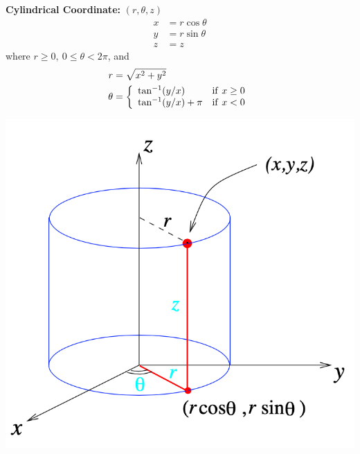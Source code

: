 \begin{spacing}{1.3}
    {\bf Cylindrical Coordinate:} $(r,\theta,z)$
    \begin{align*}
        x &= r\cos\theta\\ y&=r\sin\theta\\z&=z
    \end{align*}
    where $r\ge 0,\ 0\le \theta<2\pi$, and 
    \begin{align*}
        r &= \sqrt{x^2+y^2}\\
        \theta &= \left\{ \begin{array}{ll}
            \tan^{-1}(y/x) & {\rm if}\ x\ge 0\\
            \tan^{-1}(y/x)+\pi & {\rm if}\ x<0
        \end{array}\right.
    \end{align*}

    \begin{center}
        \includegraphics[scale=0.4]{images/Ch10-cylindrical-coor.png}
        \hspace{1in}

\end{center}
\end{spacing}
